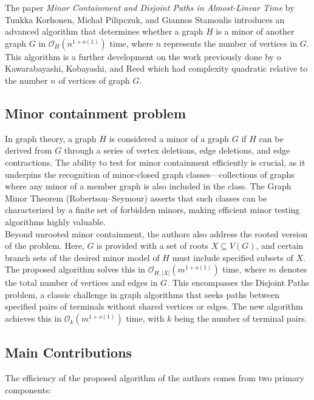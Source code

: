 
The paper \textit{Minor Containment and Disjoint Paths in Almost-Linear Time} by Tuukka Korhonen, Michał Pilipczuk, and Giannos Stamoulis introduces an advanced algorithm that determines whether a graph $H$ is a minor of another graph $G$ in 
$\mathcal{O}_H(n^{1+o(1)})$ time, where $n$ represents the number of vertices in $G$. This algorithm is a further development on the work previously done by o Kawarabayashi, Kobayashi, and Reed which had complexity quadratic relative to the number $n$ of vertices of graph $G$.

\subsection{Minor containment problem}
In graph theory, a graph $H$ is considered a minor of a graph 
$G$ if $H$ can be derived from $G$ through a series of vertex deletions, edge deletions, and edge contractions. The ability to test for minor containment efficiently is crucial, as it underpins the recognition of minor-closed graph classes—collections of graphs where any minor of a member graph is also included in the class. The Graph Minor Theorem (Robertson–Seymour) asserts that such classes can be characterized by a finite set of forbidden minors, making efficient minor testing algorithms highly valuable.
\\

Beyond unrooted minor containment, the authors also address the rooted version of the problem. Here, $G$ is provided with a set of roots $X\subseteq V(G)$, and certain branch sets of the desired minor model of
$H$ must include specified subsets of $X$. The proposed algorithm solves this in $\mathcal{O}_{H,|X|}(m^{1+o(1)})$ time, where $m$ denotes the total number of vertices and edges in $G$. This encompasses the Disjoint Paths problem, a classic challenge in graph algorithms that seeks paths between specified pairs of terminals without shared vertices or edges. The new algorithm achieves this in $\mathcal{O}_k(m^{1+o(1)})$ time, with $k$ being the number of terminal pairs. 

\subsection{Main Contributions}
The efficiency of the proposed algorithm of the authors comes from two primary components:


